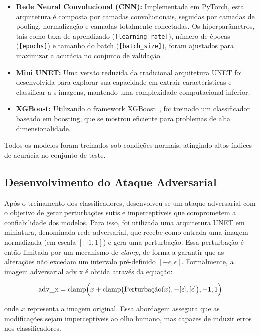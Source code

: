 \documentclass[12pt]{article}
\begin{document}
\begin{itemize}
  \item \textbf{Rede Neural Convolucional (CNN):} Implementada em PyTorch, esta
        arquitetura é composta por camadas convolucionais, seguidas por camadas de pooling,
        normalização e camadas totalmente conectadas. Os hiperparâmetros, tais como taxa
        de aprendizado (\texttt{[learning\_rate]}), número de épocas (\texttt{[epochs]}) e
        tamanho do batch (\texttt{[batch\_size]}), foram ajustados para maximizar a acurácia
        no conjunto de validação.

  \item \textbf{Mini UNET:} Uma versão reduzida da tradicional arquitetura UNET foi
        desenvolvida para explorar sua capacidade em extrair características e classificar a
        s imagens, mantendo uma complexidade computacional inferior.

  \item \textbf{XGBoost:} Utilizando o framework XGBoost~\cite{Chen_2016}, foi treinado
        um classificador baseado em boosting, que se mostrou eficiente para problemas de
        alta dimensionalidade.
\end{itemize}

Todos os modelos foram treinados sob condições normais, atingindo altos índices
de acurácia no conjunto de teste.

\subsection{Desenvolvimento do Ataque Adversarial}

Após o treinamento dos classificadores, desenvolveu-se um ataque adversarial
com o objetivo de gerar perturbações sutis e imperceptíveis que comprometem a
confiabilidade dos modelos. Para isso, foi utilizada uma arquitetura UNET em miniatura,
denominada rede adversarial, que recebe como entrada uma imagem
normalizada (em escala \([-1, 1]\)) e gera uma perturbação. Essa perturbação é
então limitada por um mecanismo de \textit{clamp}, de forma a garantir que as
alterações não excedam um intervalo pré-definido \([-\epsilon, \epsilon]\).
Formalmente, a imagem adversarial \( \text{adv\_x} \) é obtida através da
equação:

\[
  \text{adv\_x} = \text{clamp}\Bigl(x + \text{clamp}\bigl(\text{Perturbação}(x), -[\epsilon], [\epsilon]\bigr), -1, 1\Bigr)
\]

onde \( x \) representa a imagem original. Essa abordagem assegura que as
modificações sejam imperceptíveis ao olho humano, mas capazes de induzir erros
nos classificadores.
\end{document}
